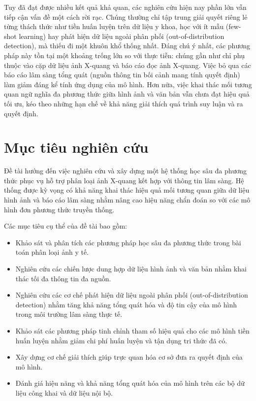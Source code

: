 Tuy đã đạt được nhiều kết quả khả quan, các nghiên cứu hiện nay phần lớn vẫn tiếp cận vấn đề một cách rời rạc. Chúng thường chỉ tập trung giải quyết riêng lẻ từng thách thức như tiền huấn luyện trên dữ liệu y khoa, học với ít mẫu (few-shot learning) hay phát hiện dữ liệu ngoài phân phối (out-of-distribution detection), mà thiếu đi một khuôn khổ thống nhất. Đáng chú ý nhất, các phương pháp này tồn tại một khoảng trống lớn so với thực tiễn: chúng gần như chỉ phụ thuộc vào cặp dữ liệu ảnh X-quang và báo cáo đọc ảnh X-quang. Việc bỏ qua các báo cáo lâm sàng tổng quát (nguồn thông tin bối cảnh mang tính quyết định) làm giảm đáng kể tính ứng dụng của mô hình. Hơn nữa, việc khai thác mối tương quan ngữ nghĩa đa phương thức giữa hình ảnh và văn bản vẫn chưa đạt hiệu quả tối ưu, kéo theo những hạn chế về khả năng giải thích quá trình suy luận và ra quyết định.

\section{Mục tiêu nghiên cứu}
Đề tài hướng đến việc nghiên cứu và xây dựng một hệ thống học sâu đa phương thức phục vụ hỗ trợ phân loại ảnh X-quang kết hợp với thông tin lâm sàng. Hệ thống được kỳ vọng có khả năng khai thác hiệu quả mối tương quan giữa dữ liệu hình ảnh và báo cáo lâm sàng nhằm nâng cao hiệu năng chẩn đoán so với các mô hình đơn phương thức truyền thống.

Các mục tiêu cụ thể của đề tài bao gồm:
\begin{itemize}
  \item Khảo sát và phân tích các phương pháp học sâu đa phương thức trong bài toán phân loại ảnh y tế.
  \item Nghiên cứu các chiến lược dung hợp dữ liệu hình ảnh và văn bản nhằm khai thác tối đa thông tin đa nguồn.
  \item Nghiên cứu các cơ chế phát hiện dữ liệu ngoài phân phối (out-of-distribution detection) nhằm tăng khả năng tổng quát hóa và độ tin cậy của mô hình trong môi trường lâm sàng thực tế.
  \item Khảo sát các phương pháp tinh chỉnh tham số hiệu quả cho các mô hình tiền huấn luyện nhằm giảm chi phí huấn luyện và tận dụng tri thức đã có.
  \item Xây dựng cơ chế giải thích giúp trực quan hóa cơ sở đưa ra quyết định của mô hình.
  \item Đánh giá hiệu năng và khả năng tổng quát hóa của mô hình trên các bộ dữ liệu công khai và dữ liệu nội bộ.
\end{itemize}

